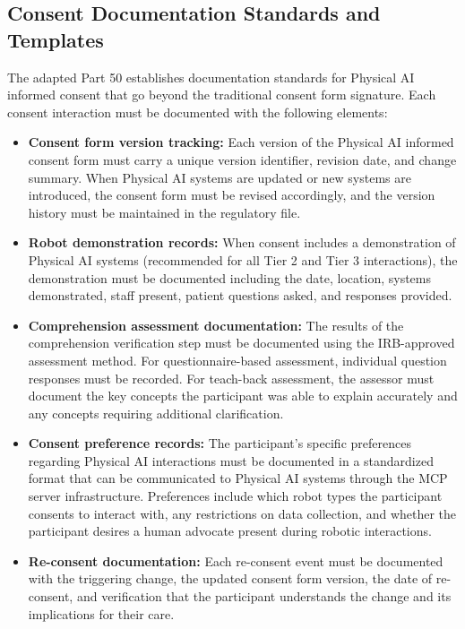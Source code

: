 \subsection{Consent Documentation Standards and Templates}
\label{subsec:cfr50-consent-templates}

The adapted Part 50 establishes documentation standards for Physical AI
informed consent that go beyond the traditional consent form signature. Each
consent interaction must be documented with the following elements:

\begin{itemize}
    \item \textbf{Consent form version tracking:} Each version of the Physical
    AI informed consent form must carry a unique version identifier, revision
    date, and change summary. When Physical AI systems are updated or new
    systems are introduced, the consent form must be revised accordingly, and
    the version history must be maintained in the regulatory file.

    \item \textbf{Robot demonstration records:} When consent includes a
    demonstration of Physical AI systems (recommended for all Tier 2 and Tier 3
    interactions), the demonstration must be documented including the date,
    location, systems demonstrated, staff present, patient questions asked, and
    responses provided.

    \item \textbf{Comprehension assessment documentation:} The results of the
    comprehension verification step must be documented using the IRB-approved
    assessment method. For questionnaire-based assessment, individual question
    responses must be recorded. For teach-back assessment, the assessor must
    document the key concepts the participant was able to explain accurately
    and any concepts requiring additional clarification.

    \item \textbf{Consent preference records:} The participant's specific
    preferences regarding Physical AI interactions must be documented in a
    standardized format that can be communicated to Physical AI systems through
    the MCP server infrastructure. Preferences include which robot types the
    participant consents to interact with, any restrictions on data collection,
    and whether the participant desires a human advocate present during robotic
    interactions.

    \item \textbf{Re-consent documentation:} Each re-consent event must be
    documented with the triggering change, the updated consent form version,
    the date of re-consent, and verification that the participant understands
    the change and its implications for their care.


\end{itemize}
